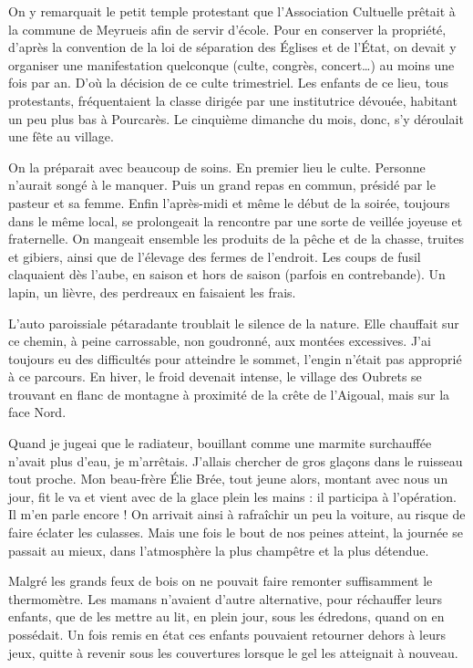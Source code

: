 On y remarquait le petit temple protestant que l’Association Cultuelle prêtait à la
commune de Meyrueis afin de servir d’école. Pour en conserver la propriété, d’après
la convention de la loi de séparation des Églises et de l’État, on devait y organiser une
manifestation quelconque (culte, congrès, concert…) au moins une fois par an. D’où
la décision de ce culte trimestriel. Les enfants de ce lieu, tous protestants,
fréquentaient la classe dirigée par une institutrice dévouée, habitant un peu plus bas à
Pourcarès. Le cinquième dimanche du mois, donc, s’y déroulait une fête au village.

On la préparait avec beaucoup de soins. En premier lieu le culte. Personne n’aurait
songé à le manquer. Puis un grand repas en commun, présidé par le pasteur et sa
femme. Enfin l’après-midi et même le début de la soirée, toujours dans le même
local, se prolongeait la rencontre par une sorte de veillée joyeuse et fraternelle. On
mangeait ensemble les produits de la pêche et de la chasse, truites et gibiers, ainsi que
de l’élevage des fermes de l’endroit. Les coups de fusil claquaient dès l’aube, en
saison et hors de saison (parfois en contrebande). Un lapin, un lièvre, des perdreaux
en faisaient les frais.

L’auto paroissiale pétaradante troublait le silence de la nature. Elle chauffait sur ce
chemin, à peine carrossable, non goudronné, aux montées excessives. J’ai toujours eu
des difficultés pour atteindre le sommet, l’engin n’était pas approprié à ce parcours.
En hiver, le froid devenait intense, le village des Oubrets se trouvant en flanc de
montagne à proximité de la crête de l’Aigoual, mais sur la face Nord.

Quand je jugeai que le radiateur, bouillant comme une marmite surchauffée n’avait
plus d’eau, je m’arrêtais. J’allais chercher de gros glaçons dans le ruisseau tout
proche. Mon beau-frère Élie Brée, tout jeune alors, montant avec nous un jour, fit le
va et vient avec de la glace plein les mains : il participa à l’opération. Il m’en parle
encore ! On arrivait ainsi à rafraîchir un peu la voiture, au risque de faire éclater les
culasses. Mais une fois le bout de nos peines atteint, la journée se passait au mieux,
dans l’atmosphère la plus champêtre et la plus détendue.

Malgré les grands feux de bois on ne pouvait faire remonter suffisamment le
thermomètre. Les mamans n’avaient d’autre alternative, pour réchauffer leurs enfants,
que de les mettre au lit, en plein jour, sous les édredons, quand on en possédait. Un
fois remis en état ces enfants pouvaient retourner dehors à leurs jeux, quitte à revenir
sous les couvertures lorsque le gel les atteignait à nouveau.

